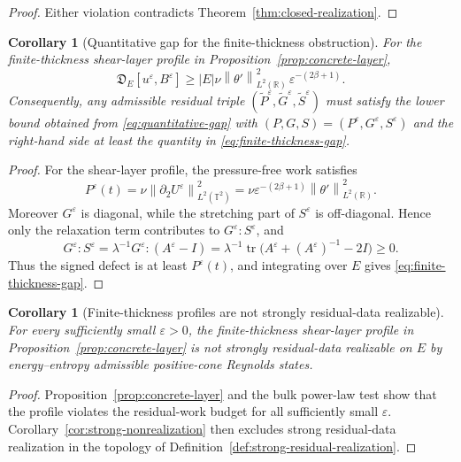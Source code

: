 \documentclass[11pt]{article}
\numberwithin{equation}{section}
\newtheorem{corollary}[theorem]{Corollary}
\newcommand{\T}{\mathbb T}
\newcommand{\R}{\mathbb R}
\newcommand{\Id}{I}
\newcommand{\tr}{\operatorname{tr}}
\newcommand{\norm}[1]{\left\lVert #1\right\rVert}
\begin{document}
\begin{proof}
Either violation contradicts Theorem~\ref{thm:closed-realization}.
\end{proof}

\begin{corollary}[Quantitative gap for the finite-thickness obstruction]
\label{cor:finite-thickness-quantitative-gap}
For the finite-thickness shear-layer profile in
Proposition~\ref{prop:concrete-layer},
\begin{equation}
  \mathfrak D_E[u^\varepsilon,B^\varepsilon]
  \ge
  |E|\nu\norm{\theta'}_{L^2(\R)}^2\,
  \varepsilon^{-(2\beta+1)} .
  \label{eq:finite-thickness-gap}
\end{equation}
Consequently, any admissible residual triple
\((\widetilde P^\varepsilon,\widetilde G^\varepsilon,
\widetilde S^\varepsilon)\) must satisfy the lower bound obtained from
\eqref{eq:quantitative-gap} with
\((P,G,S)=(P^\varepsilon,G^\varepsilon,S^\varepsilon)\) and the right-hand side
at least the quantity in \eqref{eq:finite-thickness-gap}.
\end{corollary}

\begin{proof}
For the shear-layer profile, the pressure-free work satisfies
\[
  P^\varepsilon(t)
  =
  \nu\norm{\partial_2U^\varepsilon}_{L^2(\T^2)}^2
  =
  \nu\varepsilon^{-(2\beta+1)}\norm{\theta'}_{L^2(\R)}^2 .
\]
Moreover \(G^\varepsilon\) is diagonal, while the stretching part of
\(S^\varepsilon\) is off-diagonal.  Hence only the relaxation term contributes
to \(G^\varepsilon:S^\varepsilon\), and
\[
  G^\varepsilon:S^\varepsilon
  =
  \lambda^{-1}G^\varepsilon:(A^\varepsilon-\Id)
  =
  \lambda^{-1}
  \tr\bigl(A^\varepsilon+(A^\varepsilon)^{-1}-2\Id\bigr)
  \ge0 .
\]
Thus the signed defect is at least \(P^\varepsilon(t)\), and integrating over
\(E\) gives \eqref{eq:finite-thickness-gap}.
\end{proof}

\begin{corollary}[Finite-thickness profiles are not strongly residual-data realizable]
\label{cor:finite-thickness-nonrealization}
For every sufficiently small \(\varepsilon>0\), the finite-thickness
shear-layer profile in Proposition~\ref{prop:concrete-layer} is not strongly
residual-data realizable on \(E\) by energy--entropy admissible positive-cone
Reynolds states.
\end{corollary}

\begin{proof}
Proposition~\ref{prop:concrete-layer} and the bulk power-law test show that the
profile violates the residual-work budget for all sufficiently small
\(\varepsilon\).  Corollary~\ref{cor:strong-nonrealization} then excludes strong
residual-data realization in the topology of
Definition~\ref{def:strong-residual-realization}.
\end{proof}
\end{document}
